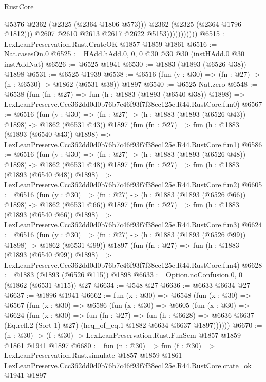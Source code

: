 \begin{lexlean}{RustCore}
\begin{coremodule}
                              @5376
                              @2362
                              (@2325 (@2364 @1806 @573)))
                            @2362
                            (@2325 (@2364 @1796 @1812)))
                          @2607
                          @2610
                          @2613
                          @2617
                          @2622
                          @5153)))))))))))
@6515 := LexLeanPreservation.Rust.CrateOK @1857 @1859 @1861
@6516 := Nat.casesOn.{0}
@6525 := HAdd.hAdd.{0, 0, 0} @30 @30 @30 (instHAdd.{0} @30 instAddNat)
@6526 := @6525 @1941
@6530 := @1883 (@1893 (@6526 @38)) @1898
@6531 := @6525 @1939
@6538 := @6516 (fun (y : @30) => (fn : @27) -> (h : @6530) -> @1862 (@6531 @38)) @1897
@6540 := @6525 Nat.zero
@6548 := @6538
    (fun (fn : @27) =>
    fun (h : @1883 (@1893 (@6540 @38)) @1898) =>
    LexLeanPreserve.Ccc362dd0d0b76b7c46f93f7f38ec125e.R44.RustCore.fun0)
@6567 := @6516
    (fun (y : @30) => (fn : @27) -> (h : @1883 (@1893 (@6526 @43)) @1898) -> @1862 (@6531 @43))
    @1897
    (fun (fn : @27) =>
    fun (h : @1883 (@1893 (@6540 @43)) @1898) =>
    LexLeanPreserve.Ccc362dd0d0b76b7c46f93f7f38ec125e.R44.RustCore.fun1)
@6586 := @6516
    (fun (y : @30) => (fn : @27) -> (h : @1883 (@1893 (@6526 @48)) @1898) -> @1862 (@6531 @48))
    @1897
    (fun (fn : @27) =>
    fun (h : @1883 (@1893 (@6540 @48)) @1898) =>
    LexLeanPreserve.Ccc362dd0d0b76b7c46f93f7f38ec125e.R44.RustCore.fun2)
@6605 := @6516
    (fun (y : @30) => (fn : @27) -> (h : @1883 (@1893 (@6526 @66)) @1898) -> @1862 (@6531 @66))
    @1897
    (fun (fn : @27) =>
    fun (h : @1883 (@1893 (@6540 @66)) @1898) =>
    LexLeanPreserve.Ccc362dd0d0b76b7c46f93f7f38ec125e.R44.RustCore.fun3)
@6624 := @6516
    (fun (y : @30) => (fn : @27) -> (h : @1883 (@1893 (@6526 @99)) @1898) -> @1862 (@6531 @99))
    @1897
    (fun (fn : @27) =>
    fun (h : @1883 (@1893 (@6540 @99)) @1898) =>
    LexLeanPreserve.Ccc362dd0d0b76b7c46f93f7f38ec125e.R44.RustCore.fun4)
@6628 := @1883 (@1893 (@6526 @115)) @1898
@6633 := Option.noConfusion.{0, 0} (@1862 (@6531 @115)) @27
@6634 := @548 @27
@6636 := @6633 @6634 @27
@6637 := @1896 @1941
@6662 := fun (x : @30) =>
  @6548
    (fun (x : @30) =>
    @6567
      (fun (x : @30) =>
      @6586
        (fun (x : @30) =>
        @6605
          (fun (x : @30) =>
          @6624
            (fun (x : @30) =>
            fun (fn : @27) =>
            fun (h : @6628) =>
            @6636 @6637 (Eq.refl.{2} (Sort 1) @27) (heq_of_eq.{1} @1882 @6634 @6637 @1897))))))
@6670 := (n : @30) -> (f : @30) -> LexLeanPreservation.Rust.FunSem @1857 @1859 @1861 @1941 @1897
@6680 := fun (n : @30) =>
  fun (f : @30) =>
  LexLeanPreservation.Rust.simulate
    @1857
    @1859
    @1861
    LexLeanPreserve.Ccc362dd0d0b76b7c46f93f7f38ec125e.R44.RustCore.crate_ok
    @1941
    @1897
\end{coremodule}
\end{lexlean}
